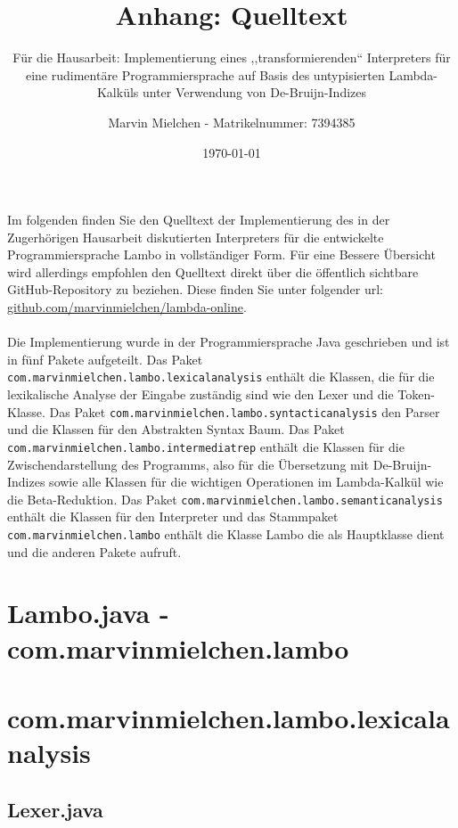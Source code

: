 \documentclass[ngerman]{article}
\title{Anhang: Quelltext}
\author{Marvin Mielchen - Matrikelnummer: 7394385}
\subtitle{Für die Hausarbeit: Implementierung eines ,,transformierenden“ Interpreters für eine rudimentäre Programmiersprache auf Basis des untypisierten Lambda-Kalküls unter Verwendung von De-Bruijn-Indizes}
\date{\today}
\begin{document}
\maketitle

Im folgenden finden Sie den Quelltext der Implementierung des in der Zugerhörigen Hausarbeit diskutierten Interpreters für die entwickelte Programmiersprache Lambo in vollständiger Form. Für eine Bessere Übersicht wird allerdings empfohlen den Quelltext direkt über die öffentlich sichtbare GitHub-Repository zu beziehen. Diese finden Sie unter folgender url: \href{https://github.com/marvinmielchen/lambda-online}{github.com/marvinmielchen/lambda-online}.\\\\
Die Implementierung wurde in der Programmiersprache Java geschrieben und ist in fünf Pakete aufgeteilt. Das Paket \texttt{com.marvinmielchen.lambo.lexicalanalysis} enthält die Klassen, die für die lexikalische Analyse der Eingabe zuständig sind wie den Lexer und die Token-Klasse. Das Paket \texttt{com.marvinmielchen.lambo.syntacticanalysis} den Parser und die Klassen für den Abstrakten Syntax Baum. Das Paket \texttt{com.marvinmielchen.lambo.intermediatrep} enthält die Klassen für die Zwischendarstellung des Programms, also für die Übersetzung mit De-Bruijn-Indizes sowie alle Klassen für die wichtigen Operationen im Lambda-Kalkül wie die Beta-Reduktion. Das Paket \texttt{com.marvinmielchen.lambo.semanticanalysis} enthält die Klassen für den Interpreter und das Stammpaket \texttt{com.marvinmielchen.lambo} enthält die Klasse Lambo die als Hauptklasse dient und die anderen Pakete aufruft.

\newpage

\section{Lambo.java - com.marvinmielchen.lambo}


\section{com.marvinmielchen.lambo.lexicalanalysis}

\subsection{Lexer.java}

\end{document}
